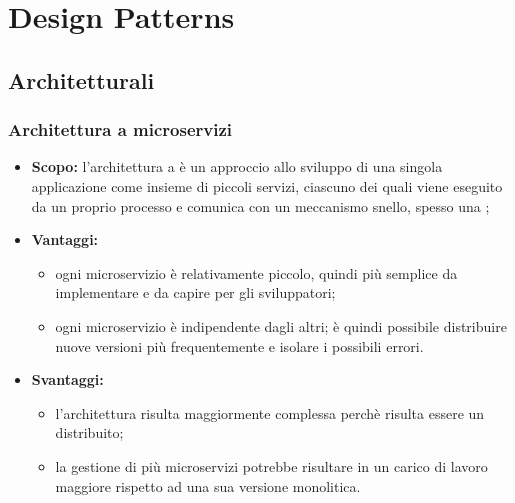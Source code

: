 \section{Design Patterns}
  \subsection{Architetturali}
    \subsubsection{Architettura a microservizi}
      \begin{itemize}
       \item \textbf{Scopo:} l'architettura a  è un approccio allo sviluppo di una singola applicazione come insieme di piccoli servizi, ciascuno dei quali viene eseguito da un proprio processo e comunica con un meccanismo snello, spesso una  ;
       \item \textbf{Vantaggi:}
	      \begin{itemize} 
	       \item ogni microservizio è relativamente piccolo, quindi più semplice da implementare e da capire per gli sviluppatori;
	       \item ogni microservizio è indipendente dagli altri; è quindi possibile distribuire nuove versioni più frequentemente e isolare i possibili errori.
	      \end{itemize}

       \item \textbf{Svantaggi:}
	\begin{itemize}
	 \item l'architettura risulta maggiormente complessa perchè risulta essere un  distribuito;
	 \item la gestione di più microservizi potrebbe risultare in un carico di lavoro maggiore rispetto ad una sua versione monolitica.
	\end{itemize}
      \end{itemize}

